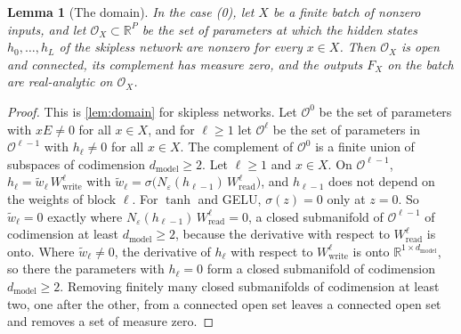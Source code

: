 \documentclass[10pt]{article}
\newtheorem{lemma}[theorem]{Lemma}
\theoremstyle{definition}
\theoremstyle{remark}
\newcommand{\R}{\mathbb{R}}
\newcommand{\Wread}{W_{\mathrm{read}}}
\newcommand{\Wwrite}{W_{\mathrm{write}}}
\newcommand{\dm}{d_{\mathrm{model}}}
\begin{document}
\begin{lemma}[The domain]\label{lem:e0domain}
In the case (0), let $X$ be a finite batch of nonzero inputs, and let $\mathcal O_X \subset \R^P$ be the set of parameters at which the hidden states $h_0, \dots, h_L$ of the skipless network are nonzero for every $x \in X$. Then $\mathcal O_X$ is open and connected, its complement has measure zero, and the outputs $F_X$ on the batch are real-analytic on $\mathcal O_X$.
\end{lemma}

\begin{proof}
This is \cref{lem:domain} for skipless networks. Let $\mathcal O^0$ be the set of parameters with $xE \neq 0$ for all $x \in X$, and for $\ell \ge 1$ let $\mathcal O^\ell$ be the set of parameters in $\mathcal O^{\ell-1}$ with $h_\ell \neq 0$ for all $x \in X$. The complement of $\mathcal O^0$ is a finite union of subspaces of codimension $\dm \ge 2$. Let $\ell \ge 1$ and $x \in X$. On $\mathcal O^{\ell-1}$, $h_\ell = \tilde w_\ell\,\Wwrite^{\ell}$ with $\tilde w_\ell = \sigma\big(N_\varepsilon(h_{\ell-1})\,\Wread^{\ell}\big)$, and $h_{\ell-1}$ does not depend on the weights of block $\ell$. For $\tanh$ and GELU, $\sigma(z) = 0$ only at $z = 0$. So $\tilde w_\ell = 0$ exactly where $N_\varepsilon(h_{\ell-1})\,\Wread^{\ell} = 0$, a closed submanifold of $\mathcal O^{\ell-1}$ of codimension at least $\dm \ge 2$, because the derivative with respect to $\Wread^{\ell}$ is onto. Where $\tilde w_\ell \neq 0$, the derivative of $h_\ell$ with respect to $\Wwrite^{\ell}$ is onto $\R^{1\times\dm}$, so there the parameters with $h_\ell = 0$ form a closed submanifold of codimension $\dm \ge 2$. Removing finitely many closed submanifolds of codimension at least two, one after the other, from a connected open set leaves a connected open set and removes a set of measure zero.
\end{proof}
\end{document}
